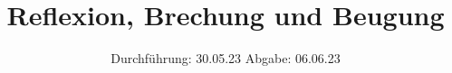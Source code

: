 

%
\usepackage{multirow}

\subject{V400}
\title{Reflexion, Brechung und Beugung}
\date{%
  Durchführung: 30.05.23
  \hspace{3em}
  Abgabe: 06.06.23
}


\setlength{\parindent}{0pt} %

\maketitle
\thispagestyle{empty}
\tableofcontents
\newpage







\printbibliography{}




